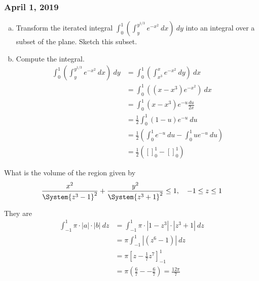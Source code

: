 \subsubsection*{April 1, 2019}

\begin{enumerate}[a.]
	\item Transform the iterated integral $\displaystyle \int_0^1 \left(\int_{y}^{y^{1/3}} e^{-x^2}\ dx\right)\ dy$ into an integral over a subset of the plane. Sketch this subset. 
	\item Compute the integral. 
	\begin{align*}
		\int_0^1 \left(\int_{y}^{y^{1/3}} e^{-x^2}\ dx\right)\ dy &= \int_0^1 \left(\int_{x^3}^{x} e^{-x^2}\ dy\right)\ dx \\
		&= \int_0^1 \left(\left(x-x^3\right)e^{-x^2}\right)\ dx \\
		&= \int_0^1 \left(x-x^3\right) e^{-u} \frac{du}{2x} \\
		&= \frac{1}{2}\int_0^1 (1-u) e^{-u}\ du \\
		&= \frac{1}{2}\left(\int_0^1 e^{-u}\ du - \int_0^1 ue^{-u}\ du\right)\\
		&= \frac{1}{2}\left(\left[\right]_0^1-\left[\right]_0^1\right)
	\end{align*}
\end{enumerate}

 What is the volume of the region given by
\[\frac{x^2}{\System{z^3-1}^2}+\frac{y^2}{\System{z^3+1}^2}\leq 1, \quad -1\leq z\leq 1\]

They are
\begin{align*}
	\int_{-1}^1 \pi\cdot |a|\cdot |b|\ dz &= \int_{-1}^1 \pi\cdot \left|1-z^3\right|\cdot \left|z^3+1\right|\ dz \\
	&= \pi \int_{-1}^1 \left|\left(z^6-1\right)\right| \ dz \\
	&= \pi \left[z - \frac{1}{7}z^7\right]_{-1}^1 \\
	&= \pi \left(\frac{6}{7}--\frac{6}{7}\right) = \frac{12\pi}{7}
\end{align*}